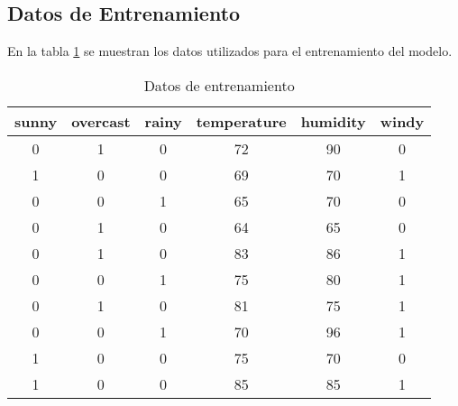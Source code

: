 \subsection{Datos de Entrenamiento} \label{subsec:Datos de Entrenamiento}

En la tabla \ref{tab:datos_entrenamiento} se muestran los datos utilizados para el entrenamiento del modelo.

\begin{table}[ht]
    \centering
    \caption{Datos de entrenamiento}
    \label{tab:datos_entrenamiento}
    \begin{tabular}{|c|c|c|c|c|c|}
    \hline
    sunny & overcast & rainy & temperature & humidity & windy \\
    \hline
    0 & 1 & 0 & 72 & 90 & 0 \\
    1 & 0 & 0 & 69 & 70 & 1 \\
    0 & 0 & 1 & 65 & 70 & 0 \\
    0 & 1 & 0 & 64 & 65 & 0 \\
    0 & 1 & 0 & 83 & 86 & 1 \\
    0 & 0 & 1 & 75 & 80 & 1 \\
    0 & 1 & 0 & 81 & 75 & 1 \\
    0 & 0 & 1 & 70 & 96 & 1 \\
    1 & 0 & 0 & 75 & 70 & 0 \\
    1 & 0 & 0 & 85 & 85 & 1 \\
    \hline
    \end{tabular}
\end{table}
